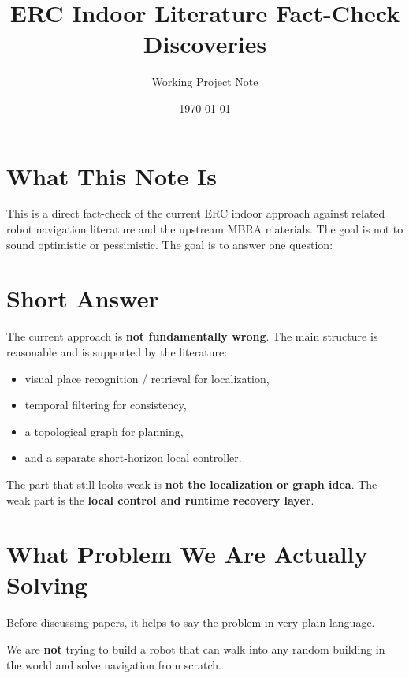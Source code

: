 \documentclass[11pt,a4paper]{article}
\title{ERC Indoor Literature Fact-Check Discoveries}
\author{Working Project Note}
\date{\today}
\begin{document}
\maketitle

\section{What This Note Is}

This is a direct fact-check of the current ERC indoor approach against related
robot navigation literature and the upstream MBRA materials.  The goal is not
to sound optimistic or pessimistic.  The goal is to answer one question:

\begin{center}
\end{center}

\section{Short Answer}

The current approach is \textbf{not fundamentally wrong}.  The main structure is
reasonable and is supported by the literature:

\begin{itemize}[nosep]
  \item visual place recognition / retrieval for localization,
  \item temporal filtering for consistency,
  \item a topological graph for planning,
  \item and a separate short-horizon local controller.
\end{itemize}

The part that still looks weak is \textbf{not the localization or graph idea}.
The weak part is the \textbf{local control and runtime recovery layer}.

\section{What Problem We Are Actually Solving}

Before discussing papers, it helps to say the problem in very plain language.

We are \textbf{not} trying to build a robot that can walk into any random
building in the world and solve navigation from scratch.
\end{document}
